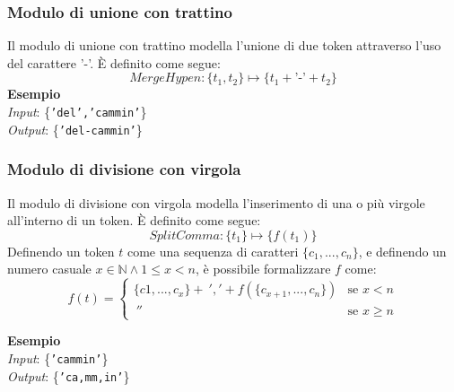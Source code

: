 \documentclass[12pt]{article}
\begin{document}
\subsubsection{Modulo di unione con trattino}
Il modulo di unione con trattino modella l'unione di due token attraverso l'uso del carattere '-'. È definito come segue:
\begin{equation}
\textit{MergeHypen}: \{ t_1,t_2 \} \mapsto \{ t_1 + \textit{'-'} + t_2 \}
\end{equation}
\textbf{Esempio}\\
\textit{Input}: \{\texttt{'del','cammin'}\}\\
\textit{Output}: \{\texttt{'del-cammin'}\}


\subsubsection{Modulo di divisione con virgola}
Il modulo di divisione con virgola modella l'inserimento di una o più virgole all'interno di un token. È definito come segue:
\begin{equation}
\textit{SplitComma}: \{ t_1 \} \mapsto \{ f(t_1) \}
\end{equation}
Definendo un token $t$ come una sequenza di caratteri $\{c_1,...,c_n\}$, e definendo un numero casuale $x \in \mathbb{N} \wedge 1 \leqslant x < n$, è possibile formalizzare $f$ come:
\begin{equation}
f(t) = \begin{cases}
\{c1,...,c_x\} +\ ',' + f(\{c_{x+1},...,c_n \})&\text{se $x < n$}\\
\ '' 									&\text{se $x \geqslant n$}
\end{cases}
\end{equation}

\noindent
\textbf{Esempio}\\
\textit{Input}: \{\texttt{'cammin'}\}\\
\textit{Output}: \{\texttt{'ca,mm,in'}\}
\end{document}
